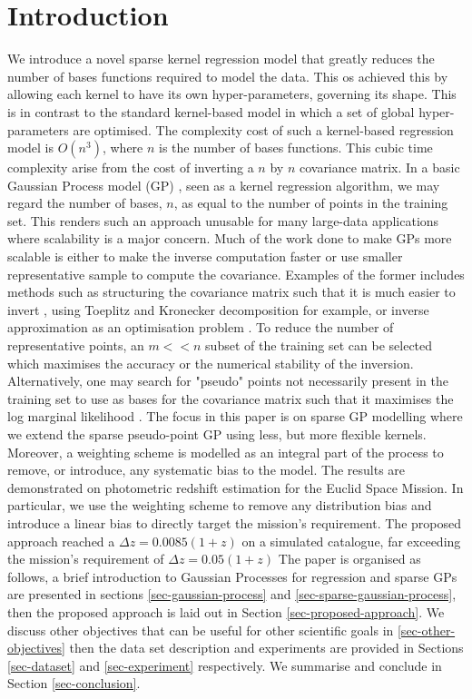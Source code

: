 \documentclass[a4paper,12pt]{article}
\begin{document}
\section{Introduction}
We introduce a novel sparse kernel regression model that greatly reduces the number of bases functions required to model the data. This os achieved this by allowing each kernel to have its own hyper-parameters, governing its shape. This is in contrast to the standard kernel-based model in which a set of global hyper-parameters are optimised. The complexity cost of such a kernel-based regression model is $O(n^{3})$, where $n$ is the number of bases functions. This cubic time complexity arise from the cost of inverting a $n$ by $n$ covariance matrix. In a basic Gaussian Process model (GP) \cite{rasmussen+williams}, seen as a kernel regression algorithm, we may regard the number of bases, $n$, as equal to the number of points in the training set. This renders such an approach unusable for many large-data applications where scalability is a major concern. Much of the work done to make GPs more scalable \cite{sparseGPcitations} is either to make the inverse computation faster or use smaller representative sample to compute the covariance. Examples of the former includes methods such as structuring the covariance matrix such that it is much easier to invert \cite{}, using Toeplitz and Kronecker decomposition for example, or inverse approximation as an optimisation problem \cite{}. To reduce the number of representative points, an $m << n$ subset of the training set can be selected which maximises the accuracy or the numerical stability of the inversion. Alternatively, one may search for "pseudo" points not necessarily present in the training set to use as bases for the covariance matrix such that it maximises the log marginal likelihood \cite{}. The focus in this paper is on sparse GP modelling where we extend the sparse pseudo-point GP using less, but more flexible kernels. Moreover, a weighting scheme is modelled as an integral part of the process to remove, or introduce, any systematic bias to the model. The results are demonstrated on photometric redshift estimation for the Euclid Space Mission. In particular, we use the weighting scheme to remove any distribution bias and introduce a linear bias to directly target the mission's requirement. The proposed approach reached a $\Delta z = 0.0085(1+z)$ on a simulated catalogue, far exceeding the mission's requirement of $\Delta z = 0.05(1+z)$ The paper is organised as follows, a brief introduction to Gaussian Processes for regression and sparse GPs are presented in sections \ref{sec-gaussian-process} and \ref{sec-sparse-gaussian-process},  then the proposed approach is laid out in Section \ref{sec-proposed-approach}. We discuss other objectives that can be useful for other scientific goals in \ref{sec-other-objectives} then the data set description and experiments are provided in Sections \ref{sec-dataset} and \ref{sec-experiment} respectively. We summarise and conclude in Section \ref{sec-conclusion}.
\end{document}
